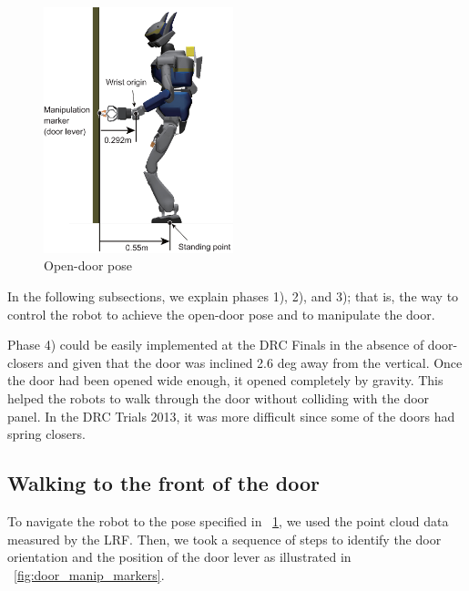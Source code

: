 \begin{figure}[t]
  \centering
  \includegraphics[width = 5.5cm]{img/door_approaching_config}
  \caption{Open-door pose}
  \label{fig:door_approaching_config}
\end{figure}



In the following subsections, we explain phases 1), 2), and 3); that is,
the way to control the robot to achieve the open-door pose and to manipulate the door.

Phase 4) could be easily implemented at the DRC Finals in the absence of door-closers 
and given that the door was inclined 2.6 deg away from the vertical.
Once the door had been opened wide enough, it opened completely by gravity.
This helped the robots to walk through the door without colliding with the door panel.
In the DRC Trials 2013, it was more difficult since some of the doors had spring closers.

\subsection{Walking to the front of the door}
%
To navigate the robot to the pose specified in \figurename~\ref{fig:door_approaching_config},
we used the point cloud data measured by the LRF. 
Then, we took a sequence of steps to identify the door orientation and the position of the
door lever as illustrated in \figurename~\ref{fig:door_manip_markers}.

